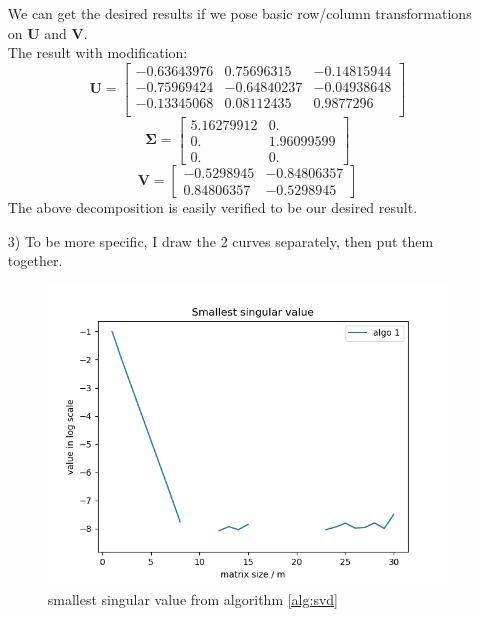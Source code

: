 \documentclass[english,onecolumn]{IEEEtran}
\begin{document}
\begin{enumerate}
    We can get the desired results if we pose basic row/column transformations on $\bm{U}$ and $\bm{V}$.\\
    The result with modification:
    $$\bm{U}=\begin{bmatrix}
        -0.63643976 &  0.75696315 & -0.14815944\\
        -0.75969424 & -0.64840237 & -0.04938648\\
        -0.13345068 &  0.08112435 & 0.9877296\\
    \end{bmatrix}$$ $$\bm{\Sigma} = \begin{bmatrix}
        5.16279912 & 0. \\
        0. & 1.96099599\\
        0. &  0.        
    \end{bmatrix}$$ $$\bm{V} = \begin{bmatrix}
        -0.5298945 & -0.84806357\\
        0.84806357 & -0.5298945
    \end{bmatrix}$$
    The above decomposition is easily verified to be our desired result.
    \newpage
    \item[3)]  To be more specific, I draw the 2 curves separately, then put them together.
    \begin{figure}[htbp]
        \begin{minipage}[t]{0.33\linewidth} 
            \centering
            \includegraphics[width=1\textwidth]{p2_3_algo1.png}
            \caption{smallest singular value from algorithm \ref{alg:svd}}
            \label{fig.p2_3_algo1}
        \end{minipage}

\end{figure}
\end{enumerate}
\end{document}
